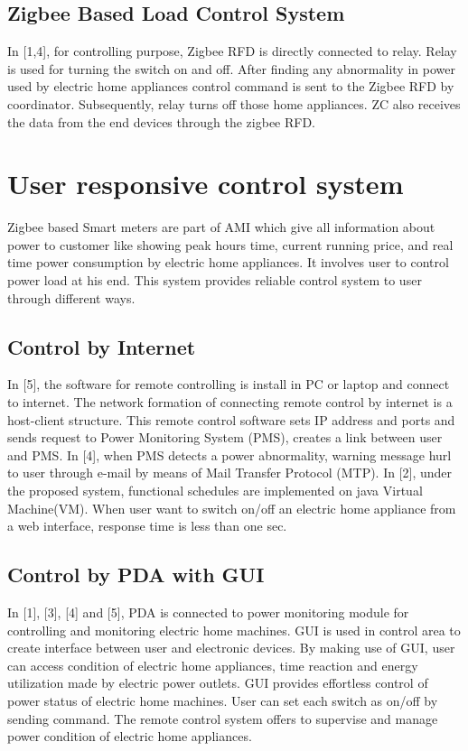 \documentclass[10pt, conference, compsocconf]{IEEEtran}
\begin{document}
\subsection{Zigbee Based Load Control System}

In [1,4], for controlling purpose, Zigbee RFD is directly connected to relay. Relay is used for turning the switch on and off. After finding any abnormality in power used by electric home appliances control command is sent to the Zigbee RFD by coordinator. Subsequently, relay turns off those home appliances. ZC also receives the data from the end devices through the zigbee RFD.

\section{User responsive control system}
Zigbee based Smart meters are part of AMI which give all information about power to customer like showing peak hours time, current running price, and real time power consumption by electric home appliances. It involves user to control power load at his end. This system provides reliable control system to user through different ways.

\subsection{Control by Internet}
In [5], the software for remote controlling is install in PC or laptop and connect to internet. The network formation of connecting remote control by internet is a host-client structure. This remote control software sets IP address and ports and sends request to Power Monitoring System (PMS), creates a link between user and PMS. In [4], when PMS detects a power abnormality, warning message hurl to user through e-mail by means of Mail Transfer Protocol (MTP). In [2], under the proposed system, functional schedules are implemented on java Virtual Machine(VM). When user want to switch on/off an electric home appliance from a web interface, response time is less than one sec.

\subsection{Control by PDA with GUI}
In [1], [3], [4] and [5], PDA is connected to power monitoring module for controlling and monitoring electric home machines. GUI is used in control area to create interface between user and electronic devices. By making use of GUI, user can access condition of electric home appliances, time reaction and energy utilization made by electric power outlets. GUI provides effortless control of power status of electric home machines. User can set each switch as on/off by sending command. The remote control system offers to supervise and manage power condition of electric home appliances.
\end{document}
